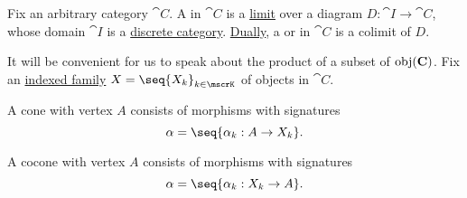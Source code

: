 \begin{definition}\label{def:discrete_category_limits}
  Fix an arbitrary category \( \cat{C} \). A  in \( \cat{C} \) is a \hyperref[def:category_of_cones/limit]{limit} over a diagram \( D: \cat{I} \to \cat{C} \), whose domain \( \cat{I} \) is a \hyperref[def:discrete_category]{discrete category}. \hyperref[thm:categorical_principle_of_duality]{Dually}, a  or  in \( \cat{C} \) is a colimit of \( D \).

  It will be convenient for us to speak about the product of a subset of \( \operatorname{obj}(\operatorname{\mathbf{C}}) \). Fix an \hyperref[def:cartesian_product/indexed_family]{indexed family} \( X = \seq{ X_k }_{k \in \mscrK} \) of objects in \( \cat{C} \).

  \begin{minipage}[t]{0.47\textwidth}
    A cone with vertex \( A \) consists of morphisms with signatures
    \begin{equation*}
      \alpha = \seq{ \alpha_k: A \to X_k }.
    \end{equation*}
  \end{minipage}
  \hfill
  \begin{minipage}[t]{0.47\textwidth}
    A cocone with vertex \( A \) consists of morphisms with signatures
    \begin{equation*}
      \alpha = \seq{ \alpha_k: X_k \to A }.
    \end{equation*}
  \end{minipage}


\end{definition}
